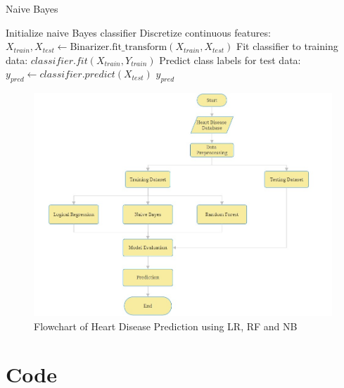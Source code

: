 \begin{algorithm}
    \caption{Naive Bayes}
    \label{algo:naive_bayes}
    \begin{algorithmic}[1]
        \Statex
        \State Initialize naive Bayes classifier
        \State Discretize continuous features: $X_{train}, X_{test} \gets \text{Binarizer.fit\_transform}(X_{train}, X_{test})$
        \State Fit classifier to training data: $classifier.fit(X_{train}, Y_{train})$
        \State Predict class labels for test data: $y_{pred} \gets classifier.predict(X_{test})$
        \State \Return $y_{pred}$
        \EndFunction
    \end{algorithmic}
\end{algorithm}


\begin{figure}
    \centering
    \includegraphics[width=1\linewidth]{figures/Flowchart.jpg}
    \caption{Flowchart of Heart Disease Prediction using LR, RF and NB}
    \label{fig:enter-label}
\end{figure}


\section{Code}

